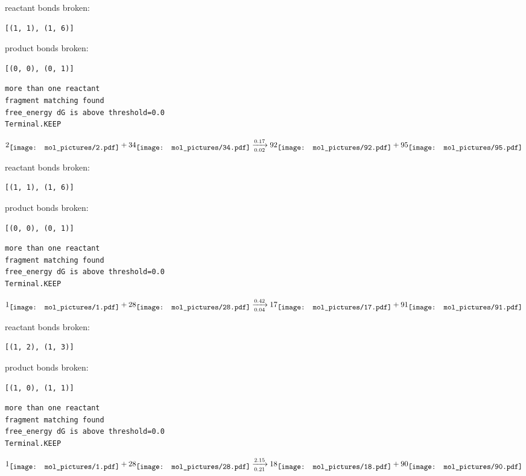 \documentclass{article}
\begin{document}
reactant bonds broken:\begin{verbatim}
[(1, 1), (1, 6)]
\end{verbatim}
product bonds broken:\begin{verbatim}
[(0, 0), (0, 1)]
\end{verbatim}




\vspace{1cm}
\begin{verbatim}
more than one reactant
fragment matching found
free_energy dG is above threshold=0.0
Terminal.KEEP
\end{verbatim}
$$
2
\raisebox{-.5\height}{\texttt{[image: mol\_pictures/2.pdf]}}
+
34
\raisebox{-.5\height}{\texttt{[image: mol\_pictures/34.pdf]}}
\xrightarrow[0.02]{0.17}
92
\raisebox{-.5\height}{\texttt{[image: mol\_pictures/92.pdf]}}
+
95
\raisebox{-.5\height}{\texttt{[image: mol\_pictures/95.pdf]}}
$$


reactant bonds broken:\begin{verbatim}
[(1, 1), (1, 6)]
\end{verbatim}
product bonds broken:\begin{verbatim}
[(0, 0), (0, 1)]
\end{verbatim}




\vspace{1cm}
\begin{verbatim}
more than one reactant
fragment matching found
free_energy dG is above threshold=0.0
Terminal.KEEP
\end{verbatim}
$$
1
\raisebox{-.5\height}{\texttt{[image: mol\_pictures/1.pdf]}}
+
28
\raisebox{-.5\height}{\texttt{[image: mol\_pictures/28.pdf]}}
\xrightarrow[0.04]{0.42}
17
\raisebox{-.5\height}{\texttt{[image: mol\_pictures/17.pdf]}}
+
91
\raisebox{-.5\height}{\texttt{[image: mol\_pictures/91.pdf]}}
$$


reactant bonds broken:\begin{verbatim}
[(1, 2), (1, 3)]
\end{verbatim}
product bonds broken:\begin{verbatim}
[(1, 0), (1, 1)]
\end{verbatim}




\vspace{1cm}
\begin{verbatim}
more than one reactant
fragment matching found
free_energy dG is above threshold=0.0
Terminal.KEEP
\end{verbatim}
$$
1
\raisebox{-.5\height}{\texttt{[image: mol\_pictures/1.pdf]}}
+
28
\raisebox{-.5\height}{\texttt{[image: mol\_pictures/28.pdf]}}
\xrightarrow[0.21]{2.15}
18
\raisebox{-.5\height}{\texttt{[image: mol\_pictures/18.pdf]}}
+
90
\raisebox{-.5\height}{\texttt{[image: mol\_pictures/90.pdf]}}
$$
\end{document}
